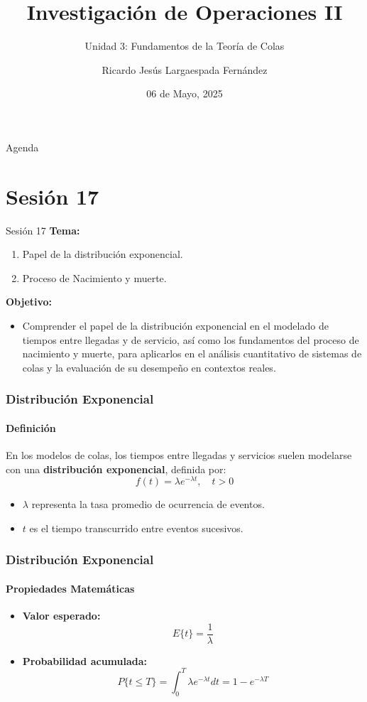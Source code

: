 \documentclass{beamer}
\title{Investigación de Operaciones II}
\subtitle{Unidad 3: Fundamentos de la Teoría de Colas}
\author[RL]{Ricardo Jesús Largaespada Fernández}
\institute[UNI]{Ingeniería de Sistemas, DACTIC, UNI}
\date{06 de Mayo, 2025}
\begin{document}
\frame{\titlepage}

\begin{frame}{Agenda}
    \tableofcontents
\end{frame}

\section{Sesión 17}

\begin{frame}{Sesión 17}
\textbf{Tema:}
\begin{enumerate}
    \item Papel de la distribución exponencial.  
\item Proceso de Nacimiento y muerte.
\end{enumerate}

\textbf{Objetivo:}
\begin{itemize}
    \item Comprender el papel de la distribución exponencial en el modelado de tiempos entre llegadas y de servicio, así como los fundamentos del proceso de nacimiento y muerte, para aplicarlos en el análisis cuantitativo de sistemas de colas y la evaluación de su desempeño en contextos reales.
\end{itemize}
\end{frame}

\begin{frame}
\frametitle{Distribución Exponencial}
\framesubtitle{Definición}

En los modelos de colas, los tiempos entre llegadas y servicios suelen modelarse con una \textbf{distribución exponencial}, definida por:
\[
f(t) = \lambda e^{-\lambda t}, \quad t > 0
\]

\begin{itemize}
    \item $\lambda$ representa la tasa promedio de ocurrencia de eventos.
    \item $t$ es el tiempo transcurrido entre eventos sucesivos.
\end{itemize}
\end{frame}

\begin{frame}
\frametitle{Distribución Exponencial}
\framesubtitle{Propiedades Matemáticas}

\begin{itemize}
    \item \textbf{Valor esperado:}
    \[
    E\{t\} = \frac{1}{\lambda}
    \]

    \item \textbf{Probabilidad acumulada:}
    \[
    P\{t \leq T\} = \int_0^T \lambda e^{-\lambda t} dt = 1 - e^{-\lambda T}
    \]
\end{itemize}
\end{frame}
\end{document}

